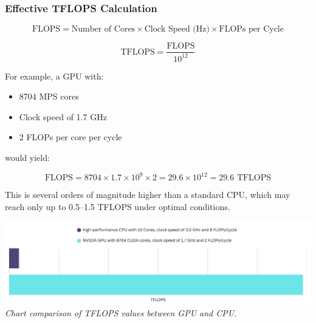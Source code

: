\subsubsection*{Effective TFLOPS Calculation} 

\[
\text{FLOPS} = \text{Number of Cores} \times \text{Clock Speed (Hz)} \times \text{FLOPs per Cycle}
\]

\[
\text{TFLOPS} = \frac{\text{FLOPS}}{10^{12}}
\]

For example, a GPU with:
\begin{itemize}
    \item 8704 MPS cores
    \item Clock speed of 1.7 GHz
    \item 2 FLOPs per core per cycle
\end{itemize}

would yield:

\[
\text{FLOPS} = 8704 \times 1.7 \times 10^9 \times 2 = 29.6 \times 10^{12} = 29.6 \text{ TFLOPS}
\]

This is several orders of magnitude higher than a standard CPU, which may reach only up to 0.5–1.5 
TFLOPS under optimal conditions.

\vspace{1em} 
\begin{center} 
    \includegraphics[width=\textwidth]{../assets/07-results/tflops-cpu-vs-gpu.png} 
    \small\textit{Chart comparison of TFLOPS values between GPU and CPU.} 
\end{center}
\vspace{1em} 


